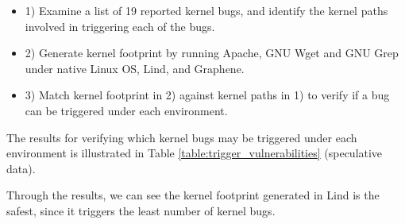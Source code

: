 \begin{itemize}
  
  \item 1) Examine a list of 19 reported kernel bugs, and identify the kernel paths involved in triggering each of the bugs.
  
  \item 2) Generate kernel footprint by running Apache, GNU Wget and GNU Grep under native Linux OS, Lind, and Graphene. 
  
  \item 3) Match kernel footprint in 2) against kernel paths in 1) to verify if a bug can be triggered under each environment. 
  
\end{itemize}

\par
The results for verifying which kernel bugs may be triggered under each environment is illustrated in Table \ref{table:trigger_vulnerabilities} (speculative data). 

\par
Through the results, we can see the kernel footprint generated in Lind is the safest, since it triggers the least number of kernel bugs.

